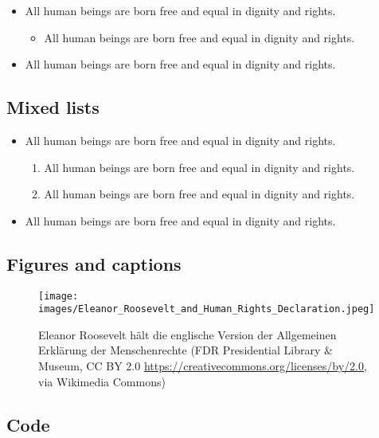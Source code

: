\documentclass[
]{beamer}
\providecommand{\tightlist}{%
  \setlength{\itemsep}{0pt}\setlength{\parskip}{0pt}}
\begin{document}
\begin{itemize}
\tightlist
\item
  All human beings are born free and equal in dignity and rights.

  \begin{itemize}
  \tightlist
  \item
    All human beings are born free and equal in dignity and rights.
  \end{itemize}
\item
  All human beings are born free and equal in dignity and rights.
\end{itemize}

\subsection{Mixed lists}\label{mixed-lists}

\begin{itemize}
\tightlist
\item
  All human beings are born free and equal in dignity and rights.

  \begin{enumerate}
  \def\labelenumi{\arabic{enumi}.}
  \tightlist
  \item
    All human beings are born free and equal in dignity and rights.
  \item
    All human beings are born free and equal in dignity and rights.
  \end{enumerate}
\item
  All human beings are born free and equal in dignity and rights.
\end{itemize}

\subsection{Figures and captions}\label{figures-and-captions}

\begin{figure}
\centering
\texttt{[image: images/Eleanor\_Roosevelt\_and\_Human\_Rights\_Declaration.jpeg]}
\caption{Eleanor Roosevelt hält die englische Version der Allgemeinen
Erklärung der Menschenrechte (FDR Presidential Library \& Museum, CC BY
2.0 \url{https://creativecommons.org/licenses/by/2.0}, via Wikimedia
Commons)}
\end{figure}

\subsection{Code}\label{code}
\end{document}
